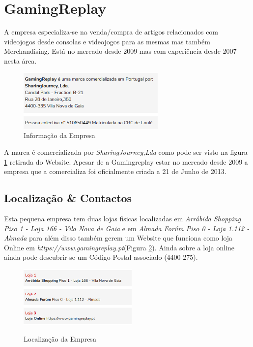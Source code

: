 \section{GamingReplay}

A empresa especializa-se na venda/compra de artigos relacionados com videojogos desde consolas e videojogos para as mesmas mas também Merchandising. Está no mercado desde 2009 mas com experiência desde 2007 nesta área.

\begin{figure}[h!]
	\centering
	
	\includegraphics[width=\textwidth,height=3cm,keepaspectratio]{Images/LocEmpresa.png}
	
	\caption{Informação da Empresa}
	
	\label{fig:LocEmpresa}
\end{figure}

A marca é comercializada por \emph{SharingJourney,Lda} como pode ser visto na figura \ref{fig:LocEmpresa}  retirada do Website. Apesar de a Gamingreplay estar no mercado desde 2009 a empresa que a comercializa foi oficialmente criada a 21 de Junho de 2013.


\subsection{Localização \& Contactos}

Esta pequena empresa tem duas lojas fisicas localizadas em \emph{Arrábida Shopping Piso 1 - Loja 166 - Vila Nova de Gaia} e em \emph{Almada Forúm Piso 0 - Loja 1.112 - Almada} para além disso também gerem um Website que funciona como loja Online em \emph{https://www.gamingreplay.pt}(Figura \ref{fig:LocLojas}).
Ainda sobre a loja online ainda pode descubrir-se um Código Postal associado (4400-275).

\begin{figure}[h!]
\caption{Localização da Empresa}
\centering
\includegraphics[width=\textwidth,height=3cm,keepaspectratio]{Images/LocLojas.png}
\label{fig:LocLojas}
\end{figure}

